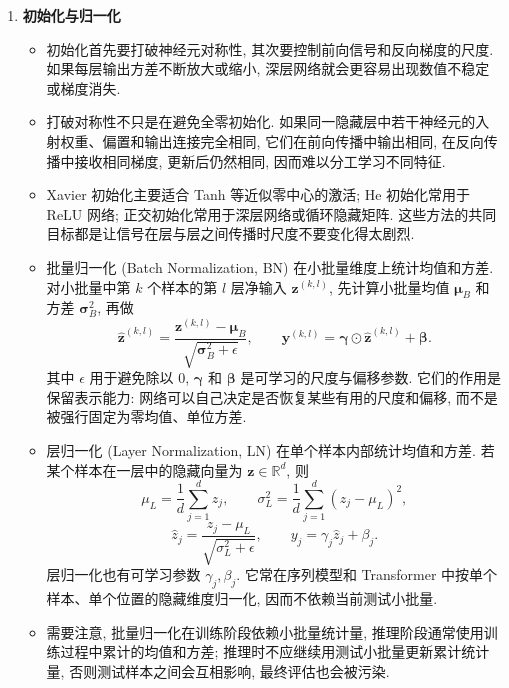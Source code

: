 \documentclass{../nndlcourse}
\begin{document}
\begin{enumerate}
    \item \textbf{初始化与归一化}
    \begin{itemize}
        \item 初始化首先要打破神经元对称性, 其次要控制前向信号和反向梯度的尺度. 如果每层输出方差不断放大或缩小, 深层网络就会更容易出现数值不稳定或梯度消失.
        \item 打破对称性不只是在避免全零初始化. 如果同一隐藏层中若干神经元的入射权重、偏置和输出连接完全相同, 它们在前向传播中输出相同, 在反向传播中接收相同梯度, 更新后仍然相同, 因而难以分工学习不同特征.
        \item Xavier 初始化主要适合 Tanh 等近似零中心的激活; He 初始化常用于 ReLU 网络; 正交初始化常用于深层网络或循环隐藏矩阵. 这些方法的共同目标都是让信号在层与层之间传播时尺度不要变化得太剧烈.
        \item 批量归一化 (Batch Normalization, BN) 在小批量维度上统计均值和方差. 对小批量中第 $k$ 个样本的第 $l$ 层净输入 $\boldsymbol{z}^{(k,l)}$, 先计算小批量均值 $\boldsymbol{\mu}_B$ 和方差 $\boldsymbol{\sigma}_B^2$, 再做
        \[
            \hat{\boldsymbol{z}}^{(k,l)}
            =
            \frac{\boldsymbol{z}^{(k,l)}-\boldsymbol{\mu}_B}
            {\sqrt{\boldsymbol{\sigma}_B^2+\epsilon}},
            \qquad
            \boldsymbol{y}^{(k,l)}
            =
            \boldsymbol{\gamma}\odot\hat{\boldsymbol{z}}^{(k,l)}
            +
            \boldsymbol{\beta}.
        \]
        其中 $\epsilon$ 用于避免除以 $0$, $\boldsymbol{\gamma}$ 和 $\boldsymbol{\beta}$ 是可学习的尺度与偏移参数. 它们的作用是保留表示能力: 网络可以自己决定是否恢复某些有用的尺度和偏移, 而不是被强行固定为零均值、单位方差.
        \item 层归一化 (Layer Normalization, LN) 在单个样本内部统计均值和方差. 若某个样本在一层中的隐藏向量为 $\boldsymbol{z}\in\mathbb{R}^{d}$, 则
        \[
            \mu_L
            =
            \frac{1}{d}\sum_{j=1}^{d} z_j,
            \qquad
            \sigma_L^2
            =
            \frac{1}{d}\sum_{j=1}^{d}{(z_j-\mu_L)}^2,
        \]
        \[
            \hat{z}_j
            =
            \frac{z_j-\mu_L}{\sqrt{\sigma_L^2+\epsilon}},
            \qquad
            y_j
            =
            \gamma_j\hat{z}_j+\beta_j.
        \]
        层归一化也有可学习参数 $\gamma_j,\beta_j$. 它常在序列模型和 Transformer 中按单个样本、单个位置的隐藏维度归一化, 因而不依赖当前测试小批量.
        \item 需要注意, 批量归一化在训练阶段依赖小批量统计量, 推理阶段通常使用训练过程中累计的均值和方差; 推理时不应继续用测试小批量更新累计统计量, 否则测试样本之间会互相影响, 最终评估也会被污染.
    \end{itemize}


\end{enumerate}
\end{document}
